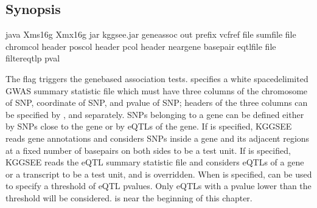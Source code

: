 \documentclass[letterpaper,10pt,english,openany,oneside]{sphinxmanual}
\begin{document}
\subsection{Synopsis}
\label{\detokenize{detailed_document:synopsis}}
\begin{sphinxVerbatim}[commandchars=\\\{\}]
java \PYGZhy{}Xms16g \PYGZhy{}Xmx16g \PYGZhy{}jar kggsee.jar
  \PYGZhy{}\PYGZhy{}gene\PYGZhy{}assoc
  \PYGZhy{}\PYGZhy{}out \PYGZlt{}prefix\PYGZgt{}
  \PYGZhy{}\PYGZhy{}vcf\PYGZhy{}ref \PYGZlt{}file\PYGZgt{}
  \PYGZhy{}\PYGZhy{}sum\PYGZhy{}file \PYGZlt{}file\PYGZgt{}
  \PYGZhy{}\PYGZhy{}chrom\PYGZhy{}col \PYGZlt{}header\PYGZgt{}  
  \PYGZhy{}\PYGZhy{}pos\PYGZhy{}col \PYGZlt{}header\PYGZgt{}  
  \PYGZhy{}\PYGZhy{}p\PYGZhy{}col \PYGZlt{}header\PYGZgt{}  
  \PYGZhy{}\PYGZhy{}neargene \PYGZlt{}basepair\PYGZgt{}  
  \PYGZhy{}\PYGZhy{}eqtl\PYGZhy{}file \PYGZlt{}file\PYGZgt{}
  \PYGZhy{}\PYGZhy{}filter\PYGZhy{}eqtl\PYGZhy{}p \PYGZlt{}pval\PYGZgt{}  
\end{sphinxVerbatim}

\sphinxAtStartPar
The flag  triggers the gene\sphinxhyphen{}based association tests.  specifies a white space\sphinxhyphen{}delimited GWAS summary statistic file which must have three columns of the chromosome of SNP, coordinate of SNP, and p\sphinxhyphen{}value of SNP; headers of the three columns can be specified by ,  and  separately. SNPs belonging to a gene can be defined either by SNPs close to the gene or by eQTLs of the gene. If  is specified, KGGSEE reads gene annotations and considers SNPs inside a gene and its adjacent regions at a fixed number of basepairs on both sides to be a test unit. If  is specified, KGGSEE reads the eQTL summary statistic file and considers eQTLs of a gene or a transcript to be a test unit, and  is overridden. When  is specified,  can be used to specify a threshold of eQTL p\sphinxhyphen{}values. Only eQTLs with a p\sphinxhyphen{}value lower than the threshold will be considered. {\hyperref[\detokenize{detailed_document:eqtl-file}]{}} is near the beginning of this chapter.
\end{document}
